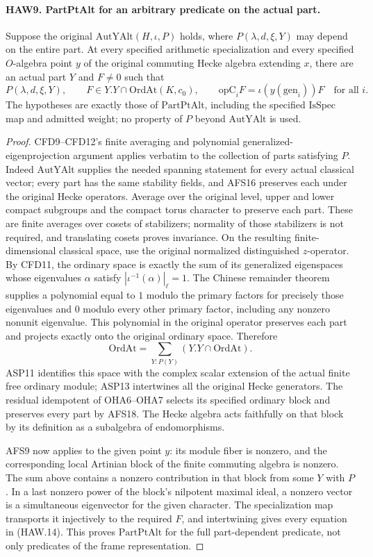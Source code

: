 \paragraph{HAW9. PartPtAlt for an arbitrary predicate on the actual part.}
\label{claim:HAW9}
Suppose the original $\mathrm{AutYAlt}(H,\iota,P)$ holds,
where $P(\lambda,d,\xi,Y)$ may depend on the entire part.
At every specified arithmetic specialization and every
specified $O$-algebra point $y$ of the original commuting
Hecke algebra extending $x$, there are an actual part $Y$
and $F\ne0$ such that
\[
 P(\lambda,d,\xi,Y),\qquad
 F\in Y.Y\cap\mathrm{OrdAt}(K,c_0),\qquad
 \mathrm{opC}_iF=\iota(y(\mathrm{gen}_i))F\quad\text{for all }i.
 \tag{HAW.14}
\]
The hypotheses are exactly those of $\mathrm{PartPtAlt}$,
including the specified $\mathrm{IsSpec}$ map and admitted
weight; no property of $P$ beyond $\mathrm{AutYAlt}$ is used.
\begin{proof}
CFD9--CFD12's finite averaging and polynomial generalized-eigenprojection
argument applies verbatim to the collection of parts satisfying
$P$.  Indeed $\mathrm{AutYAlt}$ supplies the needed spanning
statement for every actual classical vector; every part has
the same stability fields, and AFS16 preserves each under the
original Hecke operators.  Average over the original level,
upper and lower compact subgroups and the compact torus
character to preserve each part.  These are finite averages
over cosets of stabilizers; normality of those stabilizers is
not required, and translating cosets proves invariance.
On the resulting finite-dimensional classical space, use the
original normalized distinguished $z$-operator.  By CFD11,
the ordinary space is exactly the sum of its generalized
eigenspaces whose eigenvalues $\alpha$ satisfy
$|\iota^{-1}(\alpha)|_\ell=1$.  The Chinese remainder
theorem supplies a polynomial equal to $1$ modulo the
primary factors for precisely those eigenvalues and $0$
modulo every other primary factor, including any nonzero
nonunit eigenvalue.  This polynomial in the original
operator preserves each part and projects exactly onto
the original ordinary space.  Therefore
\[
       \mathrm{OrdAt}=\sum_{Y:P(Y)}(Y.Y\cap\mathrm{OrdAt}).
\]
ASP11 identifies this space with the complex scalar extension
of the actual finite free ordinary module; ASP13 intertwines
all the original Hecke generators.  The residual idempotent
of OHA6--OHA7 selects its specified ordinary block and
preserves every part by AFS18.  The Hecke algebra acts faithfully on
that block by its definition as a subalgebra of endomorphisms.

AFS9 now applies to the given point $y$: its module fiber is
nonzero, and the corresponding local Artinian block of the
finite commuting algebra is nonzero.  The sum above contains
a nonzero contribution in that block from some $Y$ with $P$.
In a last nonzero power of the block's nilpotent maximal
ideal, a nonzero vector is a simultaneous eigenvector for
the given character.  The specialization map transports it
injectively to the required $F$, and intertwining gives every
equation in (HAW.14).  This proves $\mathrm{PartPtAlt}$ for
the full part-dependent predicate, not only predicates of
the frame representation.
\end{proof}

